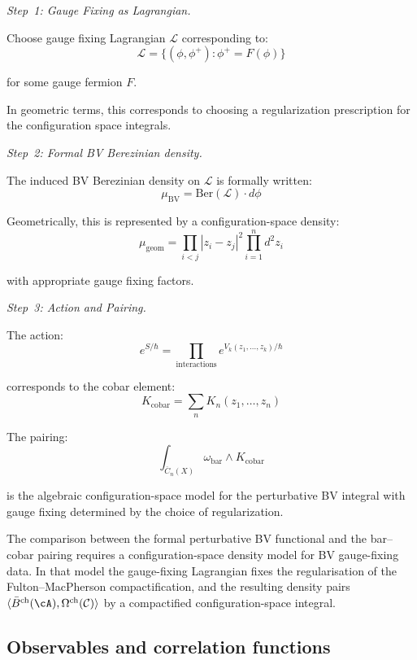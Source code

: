 \begin{evidence}
\emph{Step~1: Gauge Fixing as Lagrangian.}

Choose gauge fixing Lagrangian $\mathcal{L}$ corresponding to:
\[\mathcal{L} = \{(\phi, \phi^+) : \phi^+ = F(\phi)\}\]

for some gauge fermion $F$.

In geometric terms, this corresponds to choosing a regularization prescription
for the configuration space integrals.

\emph{Step~2: Formal BV Berezinian density.}

The induced BV Berezinian density on $\mathcal{L}$ is formally written:
\[\mu_{\text{BV}} = \text{Ber}(\mathcal{L}) \cdot d\phi\]

Geometrically, this is represented by a configuration-space density:
\[\mu_{\text{geom}} = \prod_{i<j} |z_i - z_j|^2 \prod_{i=1}^n d^2z_i\]

with appropriate gauge fixing factors.

\emph{Step~3: Action and Pairing.}

The action:
\[e^{S/\hbar} = \prod_{\text{interactions}} e^{V_k(z_1, \ldots, z_k)/\hbar}\]

corresponds to the cobar element:
\[K_{\text{cobar}} = \sum_n K_n(z_1, \ldots, z_n)\]

The pairing:
\[\int_{\overline{C}_n(X)} \omega_{\text{bar}} \wedge K_{\text{cobar}}\]

is the algebraic configuration-space model for the perturbative BV
integral with gauge fixing determined by the choice of regularization.
\end{evidence}

\begin{remark}
The comparison between the formal perturbative BV functional and the
bar--cobar pairing requires a configuration-space density model for BV
gauge-fixing data.  In that model the gauge-fixing Lagrangian fixes the
regularisation of the Fulton--MacPherson compactification, and the
resulting density pairs
$\langle \bar{B}^{\mathrm{ch}}(\cA),\Omega^{\mathrm{ch}}(\mathcal C)\rangle$
by a compactified configuration-space integral.
\end{remark}

\subsection{Observables and correlation functions}

